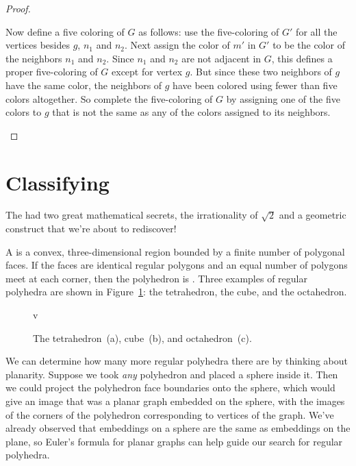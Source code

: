 \begin{proof}
\begin{description}
  Now define a five coloring of $G$ as follows: use the five-coloring of $G'$
  for all the vertices besides $g$, $n_1$ and $n_2$.  Next assign the
  color of $m'$ in $G'$ to be the color of the neighbors $n_1$ and $n_2$.
  Since $n_1$ and $n_2$ are not adjacent in $G$, this defines a proper
  five-coloring of $G$ except for vertex $g$.  But since these two
  neighbors of $g$ have the same color, the neighbors of $g$ have been
  colored using fewer than five colors altogether.  So complete the
  five-coloring of $G$ by assigning one of the five colors to $g$ that is
  not the same as any of the colors assigned to its neighbors.
\end{description}

\end{proof}

\section{Classifying }

The  had two great mathematical secrets, the
irrationality of $\sqrt{2}$ and a geometric construct that we're about
to rediscover!

A  is a convex, three-dimensional region bounded by a
finite number of polygonal faces.  If the faces are identical regular
polygons and an equal number of polygons meet at each corner, then the
polyhedron is .  Three
examples of regular polyhedra are shown in Figure~\ref{fig:polyhedra}: the
tetrahedron, the cube, and the octahedron.

\begin{figure}

\quad
{}
\quad
{}

\caption{The tetrahedron~(a), cube~(b), and octahedron~(c).}
v
\label{fig:polyhedra}
\end{figure}

We can determine how many more regular polyhedra there are by thinking
about planarity.  Suppose we took \emph{any} polyhedron and placed a
sphere inside it.  Then we could project the polyhedron face
boundaries onto the sphere, which would give an image that was a
planar graph embedded on the sphere, with the images of the corners of
the polyhedron corresponding to vertices of the graph.  We've already
observed that embeddings on a sphere are the same as embeddings on the
plane, so Euler's formula for planar graphs can help guide our search
for regular polyhedra.

